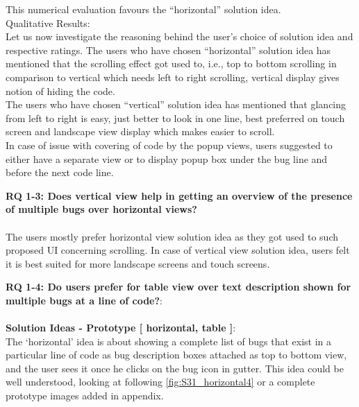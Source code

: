This numerical evaluation favours the “horizontal” solution idea. \\

Qualitative Results: \\

Let us now investigate the reasoning behind the user’s choice of solution idea and respective ratings. The users who have chosen “horizontal” solution idea has mentioned that the scrolling effect got used to, i.e., top to bottom scrolling in comparison to vertical which needs left to right scrolling, vertical display gives notion of hiding the code. \\ 
The users who have chosen “vertical” solution idea has mentioned that glancing from left to right is easy, just better to look in one line, best preferred on touch screen and landscape view display which makes easier to scroll. \\

In case of issue with covering of code by the popup views, users suggested to either have a separate view or to display popup box under the bug line and before the next code line. \\

\begin{myboxi}{{\textbf{RQ 1-3: Does vertical view help in getting an overview of the presence of multiple bugs over horizontal views?}}}
	\\ \\ The users mostly prefer horizontal view solution idea as they got used to such proposed UI concerning scrolling. In case of vertical view solution idea, users felt it is best suited for more landscape screens and touch screens.
\end{myboxi}
\hfill \break

\noindent \textbf{RQ 1-4: Do users prefer for table view over text description shown for multiple bugs at a line of code?}: \\ \\

\textbf{Solution Ideas - Prototype [ horizontal, table ]}: \\

The ‘horizontal’ idea is about showing a complete list of bugs that exist in a particular line of code as bug description boxes attached as top to bottom view, and the user sees it once he clicks on the bug icon in gutter. This idea could be well understood, looking at following \autoref{fig:S31_horizontal4} or a complete prototype images added in appendix. \\


